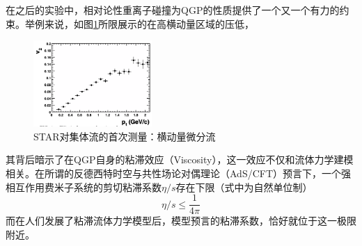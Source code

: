 \documentclass[%
 reprint,
 amsmath,amssymb,
 aps,
]{revtex4-1}
\begin{document}
在之后的实验中，相对论性重离子碰撞为QGP的性质提供了一个又一个有力的约束。举例来说，如图\ref{fig:v2pt}所限展示的在高横动量区域的压低，
\begin{figure}[htbp]
    \includegraphics[width=0.4\textwidth]{Plots/v2pt.png}
    \caption{\label{fig:v2pt}STAR对集体流的首次测量：横动量微分流}
\end{figure}
其背后暗示了在QGP自身的粘滞效应（Viscosity），这一效应不仅和流体力学建模相关。在所谓的反德西特时空与共性场论对偶理论（AdS/CFT）预言下，一个强相互作用费米子系统的剪切粘滞系数$\eta/s$存在下限（式中为自然单位制）
\begin{equation}
    \eta/s \leq \frac{1}{4\pi}
\end{equation}
而在人们发展了粘滞流体力学模型后，模型预言的粘滞系数，恰好就位于这一极限附近。
\end{document}
